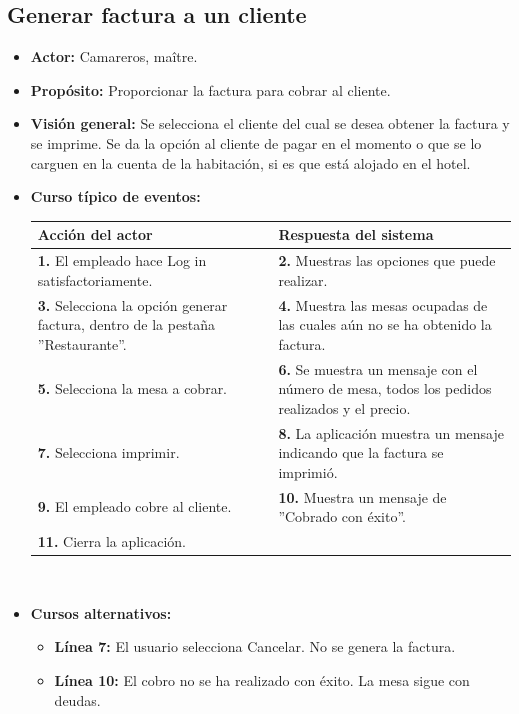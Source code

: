 \documentclass[spanish,a4paper,12pt]{report}	%
\begin{document}

		\subsection{Generar factura a un cliente}
			\begin{itemize}
			\item \textbf{Actor:} Camareros, maître.
			\item \textbf{Propósito: } Proporcionar la factura para cobrar al cliente.
			\item \textbf{Visión general:} Se selecciona el cliente del cual se desea obtener la factura y se imprime. Se da la opción al cliente de pagar en el momento o que se lo carguen en la cuenta de la habitación, si es que está alojado en el hotel.
			\item \textbf{Curso típico de eventos:} 	\\
				\begin{tabular}{|p{6cm}||p{6cm}|}
				\hline
				\textbf{Acción del actor} & \textbf{Respuesta del sistema} \\ \hline \hline
				\textbf{1.}   El empleado hace Log in satisfactoriamente. & \textbf{2.} Muestras las opciones que puede realizar. \\ \hline
				\textbf{3.} Selecciona la opción generar factura, dentro de la pestaña ''Restaurante''. & \textbf{4.} Muestra las mesas ocupadas de las cuales aún no se ha obtenido la factura. \\ \hline
				\textbf{5.} Selecciona la mesa a cobrar.	& \textbf{6.} Se muestra un mensaje con el número de mesa, todos los pedidos realizados y el precio. \\ \hline
				\textbf{7.} Selecciona imprimir.	& \textbf{8.} La aplicación muestra un mensaje indicando que la factura se imprimió. \\ \hline
				\textbf{9.} El empleado cobre al cliente.	& \textbf{10.} Muestra un mensaje de ''Cobrado con éxito''. \\ \hline
				\textbf{11.} Cierra la aplicación. &  \\ \hline
			\end{tabular}
			\\
			\item \textbf{Cursos alternativos:} 
			\begin{itemize}
			\item  \textbf{Línea 7:} El usuario selecciona Cancelar. No se genera la factura.
			\item  \textbf{Línea 10:} El cobro no se ha realizado con éxito. La mesa sigue con deudas.
			\end {itemize}
		\end {itemize}
		
\end{document}
